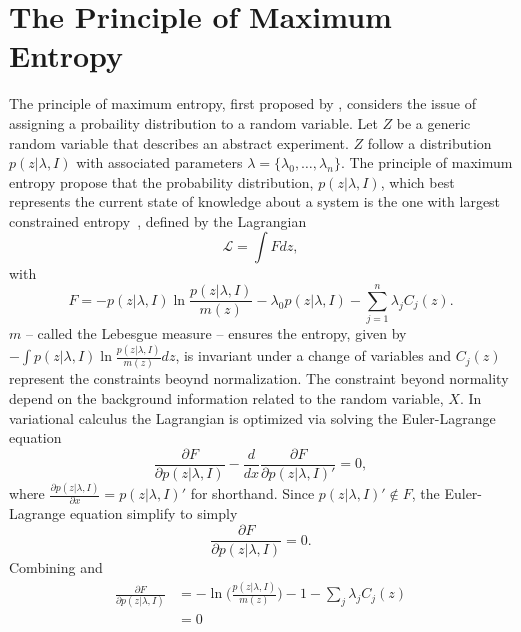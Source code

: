 \section{The Principle of Maximum Entropy}
\label{sec:maxent}
The principle of maximum entropy, first proposed by \citet{Jaynes1957}, considers the issue of assigning a probaility distribution to a random variable. Let $Z$ be a generic random variable that describes an abstract experiment. $Z$ follow a distribution $p(z|\lambda, I)$ with associated parameters $\lambda = \{\lambda_0,\dots ,\lambda_n\}$. The principle of maximum entropy propose that the probability distribution, $p(z|\lambda, I)$, which best represents the current state of knowledge about a system is the one with largest constrained entropy~\citep{Sivia2006}, defined by the Lagrangian
\begin{equation}
	\mathcal{L} = \int F dz,
	\label{eq:Q}
\end{equation}
with
\begin{equation}
	F= -p(z|\lambda, I)\ln\frac{p(z|\lambda, I)}{m(z)}-\lambda_0 p(z|\lambda, I)-\sum_{j=1}^{n}\lambda_jC_j(z).
\end{equation}
$m$ -- called the Lebesgue measure -- ensures the entropy, given by $-\int p(z|\lambda, I)\ln\frac{p(z|\lambda, I)}{m(z)} dz$, is invariant under a change of variables and $C_j(z)$ represent the constraints beoynd normalization. The constraint beyond normality depend on the background information related to the random variable, $X$. In variational calculus the Lagrangian is optimized via solving the Euler-Lagrange equation
\begin{equation}
	\frac{\partial F}{\partial p(z|\lambda, I)}-\frac{d}{dx}\frac{\partial F}{\partial p(z|\lambda, I)'}=0,
\end{equation}
where $\frac{\partial p(z|\lambda, I)}{\partial x} = p(z|\lambda, I)'$ for shorthand. Since $p(z|\lambda, I)'\notin F$, the Euler-Lagrange equation simplify to simply
\begin{equation}
	\frac{\partial F}{\partial p(z|\lambda, I)}=0.
	\label{eq:f}
\end{equation}
Combining  and 
\begin{equation}
	\begin{split}
		\frac{\partial F}{\partial p(z|\lambda, I)}&= -\ln\bigg(\frac{p(z|\lambda, I)}{m(z)}\bigg)-1-\sum_{j}\lambda_{j}C_j(z)\\
		&=0
	\end{split}
\end{equation}
